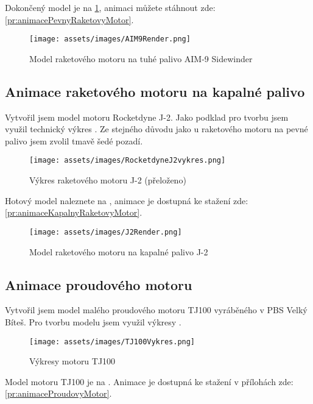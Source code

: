 {Dokončený model je na \ref{obr:AIM9Render}, animaci můžete stáhnout zde: \ref{pr:animacePevnyRaketovyMotor}.}

\begin{figure}[H]
    \centering
    \texttt{[image: assets/images/AIM9Render.png]}
    \caption{Model raketového motoru na tuhé palivo AIM-9 Sidewinder \jaObr}
    \label{obr:AIM9Render}
\end{figure}

\newpage

\subsection{Animace raketového motoru na kapalné palivo}
{Vytvořil jsem model motoru Rocketdyne J-2. Jako podklad pro tvorbu jsem využil technický výkres . Ze stejného důvodu jako u raketového motoru na pevné palivo jsem zvolil tmavě šedé pozadí.}
\cite{HR:F1RocketEngine}

\begin{figure}[H]
    \centering
    \texttt{[image: assets/images/RocketdyneJ2vykres.png]}
    \caption{Výkres raketového motoru J-2 (přeloženo)}
    \label{obr:J2vykres}
\end{figure}

{Hotový model naleznete na , animace je dostupná ke stažení zde: \ref{pr:animaceKapalnyRaketovyMotor}.}

\begin{figure}[H]
    \centering
    \texttt{[image: assets/images/J2Render.png]}
    \caption{Model raketového motoru na kapalné palivo J-2 \jaObr}
    \label{obr:J2Render}
\end{figure}

\newpage

\subsection{Animace proudového motoru}
{Vytvořil jsem model malého proudového motoru TJ100 vyráběného v PBS Velký Bíteš. Pro tvorbu modelu jsem využil výkresy .}
\cite{PBS:Minijets}

\begin{figure}[H]
    \centering
    \texttt{[image: assets/images/TJ100Vykres.png]}
    \caption{Výkresy motoru TJ100}
    \label{obr:PBSTJ100Vykres}
\end{figure}

{Model motoru TJ100 je na . Animace je dostupná ke stažení v přílohách zde: \ref{pr:animaceProudovyMotor}.}

